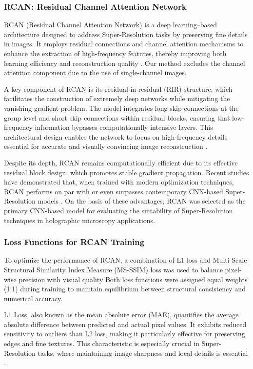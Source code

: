 \documentclass[10pt,twocolumn]{article}
\begin{document}
\subsubsection{RCAN: Residual Channel Attention Network}
RCAN (Residual Channel Attention Network) is a deep learning–based architecture designed to address Super-Resolution tasks by preserving fine details in images. It employs residual connections and channel attention mechanisms to enhance the extraction of high-frequency features, thereby improving both learning efficiency and reconstruction quality \cite{Zhang2018}. Our method excludes the channel attention component due to the use of single-channel images.

A key component of RCAN is its residual-in-residual (RIR) structure, which facilitates the construction of extremely deep networks while mitigating the vanishing gradient problem. The model integrates long skip connections at the group level and short skip connections within residual blocks, ensuring that low-frequency information bypasses computationally intensive layers. This architectural design enables the network to focus on high-frequency details essential for accurate and visually convincing image reconstruction \cite{Zhang2018}.

Despite its depth, RCAN remains computationally efficient due to its effective residual block design, which promotes stable gradient propagation. Recent studies have demonstrated that, when trained with modern optimization techniques, RCAN performs on par with or even surpasses contemporary CNN-based Super-Resolution models \cite{Lin2022}. On the basis of these advantages, RCAN was selected as the primary CNN-based model for evaluating the suitability of Super-Resolution techniques in holographic microscopy applications.

\subsubsection{Loss Functions for RCAN Training}
To optimize the performance of RCAN, a combination of L1 loss and Multi-Scale Structural Similarity Index Measure (MS-SSIM) loss was used to balance pixel-wise precision with visual quality Both loss functions were assigned equal weights (1:1) during training to maintain equilibrium between structural consistency and numerical accuracy.

L1 Loss, also known as the mean absolute error (MAE), quantifies the average absolute difference between predicted and actual pixel values. It exhibits reduced sensitivity to outliers than L2 loss, making it particularly effective for preserving edges and fine textures. This characteristic is especially crucial in Super-Resolution tasks, where maintaining image sharpness and local details is essential \cite{Arezoomand2021}.
\end{document}
